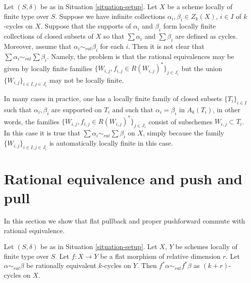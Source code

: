 \begin{remark}
\label{remark-infinite-sums-rational-equivalences}
Let $(S, \delta)$ be as in Situation \ref{situation-setup}.
Let $X$ be a scheme locally of finite type over $S$.
Suppose we have infinite collections $\alpha_i, \beta_i \in Z_k(X)$,
$i \in I$ of $k$-cycles on $X$. Suppose that the supports
of $\alpha_i$ and $\beta_i$ form locally finite collections
of closed subsets of $X$ so that $\sum \alpha_i$
and $\sum \beta_i$ are defined as cycles. Moreover, assume that
$\alpha_i \sim_{rat} \beta_i$ for each $i$. Then it is not
clear that $\sum \alpha_i \sim_{rat} \sum \beta_i$. Namely,
the problem is that the rational equivalences may be
given by locally finite
families $\{W_{i, j}, f_{i, j} \in R(W_{i, j})^*\}_{j \in J_i}$
but the union $\{W_{i, j}\}_{i \in I, j\in J_i}$ may not
be locally finite.

\medskip\noindent
In many cases in practice, one has a locally finite family of closed
subsets $\{T_i\}_{i \in I}$ such that $\alpha_i, \beta_i$
are supported on $T_i$ and such that $\alpha_i = \beta_i$
in $A_k(T_i)$, in other words, the families
$\{W_{i, j}, f_{i, j} \in R(W_{i, j})^*\}_{j \in J_i}$
consist of subschemes $W_{i, j} \subset T_i$. In this case it is true that
$\sum \alpha_i \sim_{rat} \sum \beta_i$ on $X$, simply because
the family $\{W_{i, j}\}_{i \in I, j\in J_i}$ is automatically
locally finite in this case.
\end{remark}






\section{Rational equivalence and push and pull}
\label{section-properties-rational-equivalence}

\noindent
In this section we show that flat pullback and proper pushforward
commute with rational equivalence.

\begin{lemma}
\label{lemma-flat-pullback-rational-equivalence}
Let $(S, \delta)$ be as in Situation \ref{situation-setup}.
Let $X$, $Y$ be schemes locally of finite type over $S$.
Let $f : X \to Y$ be a flat morphism of relative dimension $r$.
Let $\alpha \sim_{rat} \beta$ be rationally equivalent $k$-cycles on $Y$.
Then $f^*\alpha \sim_{rat} f^*\beta$ as $(k + r)$-cycles on $X$.
\end{lemma}

